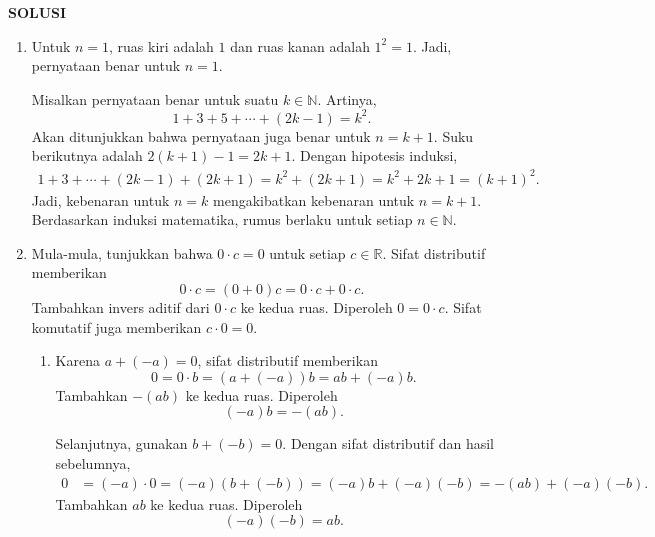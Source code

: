 \documentclass[11pt,a4paper]{article}
\newcommand{\R}{\mathbb{R}}
\newcommand{\N}{\mathbb{N}}
\begin{document}
\newpage
\begin{center}
  \textbf{SOLUSI}
\end{center}
\begin{enumerate}[itemsep=12pt,parsep=5pt]
  \item Untuk $n=1$, ruas kiri adalah $1$ dan ruas kanan adalah $1^2=1$.
        Jadi, pernyataan benar untuk $n=1$.

        Misalkan pernyataan benar untuk suatu $k\in\N$.
        Artinya,
        \[
          1+3+5+\cdots+(2k-1)=k^2.
        \]
        Akan ditunjukkan bahwa pernyataan juga benar untuk $n=k+1$.
        Suku berikutnya adalah $2(k+1)-1=2k+1$.
        Dengan hipotesis induksi,
        \begin{align*}
          1+3+\cdots+(2k-1)+(2k+1)
          =k^2+(2k+1)
          =k^2+2k+1
          =(k+1)^2.
        \end{align*}
        Jadi, kebenaran untuk $n=k$ mengakibatkan kebenaran untuk $n=k+1$.
        Berdasarkan induksi matematika, rumus berlaku untuk setiap $n\in\N$.

  \item Mula-mula, tunjukkan bahwa $0\cdot c=0$ untuk setiap $c\in\R$.
        Sifat distributif memberikan
        \[
          0\cdot c=(0+0)c=0\cdot c+0\cdot c.
        \]
        Tambahkan invers aditif dari $0\cdot c$ ke kedua ruas.
        Diperoleh $0=0\cdot c$.
        Sifat komutatif juga memberikan $c\cdot0=0$.

        \begin{enumerate}
          \item Karena $a+(-a)=0$, sifat distributif memberikan
                \[
                  0=0\cdot b=(a+(-a))b=ab+(-a)b.
                \]
                Tambahkan $-(ab)$ ke kedua ruas.
                Diperoleh
                \[
                  (-a)b=-(ab).
                \]

                Selanjutnya, gunakan $b+(-b)=0$.
                Dengan sifat distributif dan hasil sebelumnya,
                \begin{align*}
                  0
                   & =(-a)\cdot0
                  =(-a)(b+(-b))
                  =(-a)b+(-a)(-b)
                  =-(ab)+(-a)(-b).
                \end{align*}
                Tambahkan $ab$ ke kedua ruas.
                Diperoleh
                \[
                  (-a)(-b)=ab.
                \]


\end{enumerate}
\end{enumerate}
\end{document}
